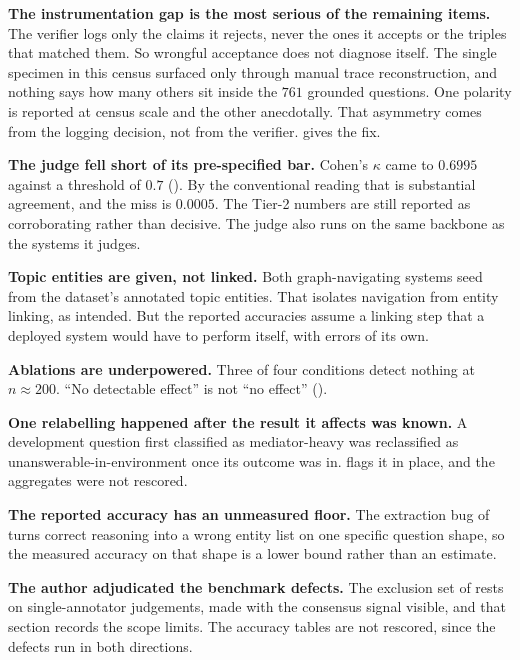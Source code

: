 \textbf{The instrumentation gap is the most serious of the remaining items.} The
verifier logs only the claims it rejects, never the ones it accepts or the
triples that matched them. So wrongful acceptance does not diagnose itself. The
single specimen in this census surfaced only through manual trace
reconstruction, and nothing says how many others sit inside the $761$ grounded
questions. One polarity is reported at census scale and the other anecdotally.
That asymmetry comes from the logging decision, not from the verifier.
 gives the fix.

\textbf{The judge fell short of its pre-specified bar.} Cohen's $\kappa$ came to
$0.6995$ against a threshold of $0.7$ (). By the conventional
reading that is substantial agreement, and the miss is $0.0005$. The Tier-2
numbers are still reported as corroborating rather than decisive. The judge also
runs on the same backbone as the systems it judges.

\textbf{Topic entities are given, not linked.} Both graph-navigating systems
seed from the dataset's annotated topic entities. That isolates navigation from
entity linking, as intended. But the reported accuracies assume a linking step
that a deployed system would have to perform itself, with errors of its own.

\textbf{Ablations are underpowered.} Three of four conditions detect nothing at
$n \approx 200$. ``No detectable effect'' is not ``no effect''
().

\textbf{One relabelling happened after the result it affects was known.} A
development question first classified as mediator-heavy was reclassified as
unanswerable-in-environment once its outcome was in.
 flags it in place, and the aggregates were not
rescored.

\textbf{The reported accuracy has an unmeasured floor.} The extraction bug of
 turns correct reasoning into a wrong entity list
on one specific question shape, so the measured accuracy on that shape is a
lower bound rather than an estimate.

\textbf{The author adjudicated the benchmark defects.} The exclusion set of
 rests on single-annotator judgements, made with the
consensus signal visible, and that section records the scope limits. The
accuracy tables are not rescored, since the defects run in both directions.

\endinput

